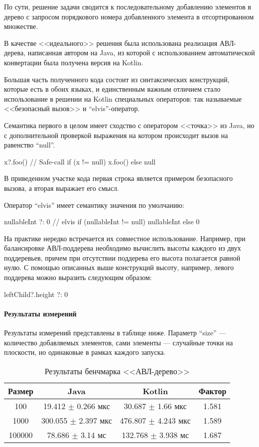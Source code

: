 По сути, решение задачи сводится к последовательному добавлению элементов в дерево с запросом
порядкового номера добавленного элемента в отсортированном множестве.

В качестве <<идеального>> решения была использована реализация АВЛ-дерева, написанная автором
на Java, из которой с использованием автоматической конвертации была получена версия на Kotlin.

Большая часть полученного кода состоит из синтаксических конструкций, которые есть в обоих языках,
и единственным важным отличием стало использование в решении на Kotlin специальных операторов:
так называемые <<безопасный вызов>> и ``elvis''-оператор.

Семантика первого в целом имеет сходство с оператором <<точка>> из Java, но с дополнительной
проверкой выражения на котором происходит вызов на равенство ``null''.
\begin{pyglist}[language=kotlin]
x?.foo() // Safe-call
if (x != null) x.foo() else null
\end{pyglist}
В приведенном участке кода первая строка является примером безопасного вызова, а вторая
выражает его смысл.

Оператор ``elvis'' имеет семантику значения по умолчанию:
\begin{pyglist}[language=kotlin]
nullableInt ?: 0 // elvis
if (nullableInt != null) nullableInt else 0
\end{pyglist}

На практике нередко встречается их совместное использование.
Например, при балансировке АВЛ-поддерева необходимо вычислить высоты каждого из двух поддеревьев,
причем при отсутствии поддерева его высота полагается равной нулю.
С помощью описанных выше конструкций высоту, например, левого поддерева можно выразить следующим
образом:
\begin{pyglist}[language=kotlin]
leftChild?.height ?: 0
\end{pyglist}

\paragraph{Результаты измерений}
Результаты измерений представлены в таблице ниже.
Параметр ``size'' --- количество добавляемых элементов, сами элементы --- случайные точки
на плоскости, но одинаковые в рамках каждого запуска.

\begin{table}[h]
\begin{center}
\begin{tabular}{|c|c|c|c|} \hline
Размер & Java & Kotlin & Фактор \\ \hline
100 & 19.412 $\pm$ 0.266 мкс & 30.687 $\pm$ 1.66 мкс & 1.581\\ \hline
1000 & 300.055 $\pm$ 2.397 мкс & 476.807 $\pm$ 4.243 мкс & 1.589\\ \hline
100000 & 78.686 $\pm$ 3.14 мс & 132.768 $\pm$ 3.938 мс & 1.687\\ \hline
\end{tabular}
\caption{Результаты бенчмарка <<АВЛ-дерево>>}
\end{center}
\end{table}

